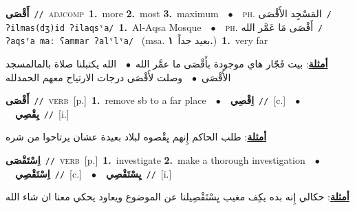 \documentclass[10pt,a4paper,twoside]{article} %
\begin{document}
\begin{multicols}{2}
{\setlength\topsep{0pt}\textbf{\foreignlanguage{arabic}{أَقْصَى}}\ {\color{gray}\texttt{//}\color{black}}\ \textsc{adj\textunderscore comp}\ \textbf{1.}~more  \textbf{2.}~most  \textbf{3.}~maximum\ \ $\bullet$\ \ \textsc{ph.} \color{gray} \foreignlanguage{arabic}{المَسْجِد الأَقْصَى}\color{black}\ {\color{gray}\texttt{/{\sffamily ʔilmas(dʒ)id ʔilaqsˤa}/}\color{black}}\ \textbf{1.}~Al-Aqsa Mosque\ \ $\bullet$\ \ \textsc{ph.} \color{gray} \foreignlanguage{arabic}{أَقْصَى مَا عَمَّر الله}\color{black}\ {\color{gray}\texttt{/{\sffamily ʔaqsˤa maː ʕammar ʔalˤlˤa}/}\color{black}}\ \color{gray} (msa. \foreignlanguage{arabic}{بعيد جداً}~\foreignlanguage{arabic}{\textbf{١.}})\color{black}\ \textbf{1.}~very far\  \begin{flushright}\color{gray}\foreignlanguage{arabic}{\textbf{\underline{\foreignlanguage{arabic}{أمثلة}}}: بيت فَجّار هاي موجودة بأَقْصَى ما عمَّر الله\ $\bullet$\ \  الله يكتبلنا صلاة بالمالمسجد الأَقْصَى\ $\bullet$\ \  وصلت لأَقْصَى درجات الارتياح معهم الحمدلله}\end{flushright}\color{black}} \vspace{2mm}

{\setlength\topsep{0pt}\textbf{\foreignlanguage{arabic}{أَقْصَى}}\ {\color{gray}\texttt{//}\color{black}}\ \textsc{verb}\ [p.]\ \textbf{1.}~remove sb to a far place\ \ $\bullet$\ \ \setlength\topsep{0pt}\textbf{\foreignlanguage{arabic}{اِقْصِي}}\ {\color{gray}\texttt{//}\color{black}}\ [c.]\ \ $\bullet$\ \ \setlength\topsep{0pt}\textbf{\foreignlanguage{arabic}{يِقْصِي}}\ {\color{gray}\texttt{//}\color{black}}\ [i.]\  \begin{flushright}\color{gray}\foreignlanguage{arabic}{\textbf{\underline{\foreignlanguage{arabic}{أمثلة}}}: طلب الحاكم إِنهم يِقْصوه لبلاد بعيدة عشان يرتاحوا من شره}\end{flushright}\color{black}} \vspace{2mm}

{\setlength\topsep{0pt}\textbf{\foreignlanguage{arabic}{اِسْتَقْصَى}}\ {\color{gray}\texttt{//}\color{black}}\ \textsc{verb}\ [p.]\ \textbf{1.}~investigate  \textbf{2.}~make a thorough investigation\ \ $\bullet$\ \ \setlength\topsep{0pt}\textbf{\foreignlanguage{arabic}{اِسْتَقْصِي}}\ {\color{gray}\texttt{//}\color{black}}\ [c.]\ \ $\bullet$\ \ \setlength\topsep{0pt}\textbf{\foreignlanguage{arabic}{يِسْتَقْصِي}}\ {\color{gray}\texttt{//}\color{black}}\ [i.]\  \begin{flushright}\color{gray}\foreignlanguage{arabic}{\textbf{\underline{\foreignlanguage{arabic}{أمثلة}}}: حكالي إِنه بده يكِف مغيب يِسْتَقْصِيلنا عن الموضوع ويعاود يحكي معنا ان شاء الله}\end{flushright}\color{black}} \vspace{2mm}


\end{multicols}
\end{document}

